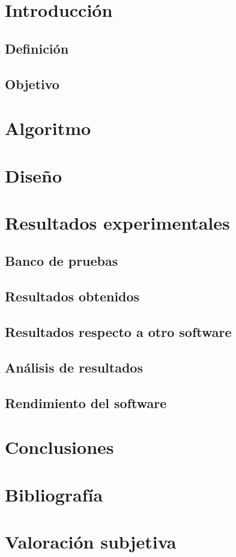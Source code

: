 \documentclass[11pt, titlepage,a4paper]{article}
\title{\textbf{\huge{Mineria de Datos} \\Laboratorio 6: Clustering
Jerarquico \newline
\begin{center}\texttt{[image: ./images/Portada.jpg]}\newline\footnote{Imagen extraida de
\url{http://jmj-qa.blogspot.com.es/2011/09/analisis-cluster.html}}\end{center}}
}
\author{Alberto Fernández \and Arkaitz Marcos \and Endika Serrano}
\date{}
\begin{document}
\maketitle

\tableofcontents

\newpage

\section{Introducción}


\subsection{Definición}


\subsection{Objetivo}


\section{Algoritmo}

\section{Diseño}

\section{Resultados experimentales}

\subsection{Banco de pruebas}

\subsection{Resultados obtenidos}

\subsection{Resultados respecto a otro software}

\subsection{Análisis de resultados}

\subsection{Rendimiento del software}

\section{Conclusiones}

\section{Bibliografía}

\section{Valoración subjetiva}
\end{document}
